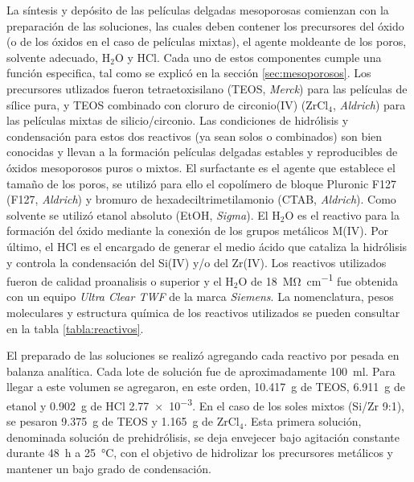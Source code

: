 			La síntesis y depósito de las películas delgadas mesoporosas comienzan con la preparación de las soluciones, las cuales deben contener los precursores del óxido (o de los óxidos en el caso de películas mixtas), el agente moldeante de los poros, solvente adecuado, H$_2$O y HCl\cite{Brinker1990}. Cada uno de estos componentes cumple una función especifica, tal como se explicó en la sección \ref{sec:mesoporosos}. Los precursores utlizados fueron tetraetoxisilano (TEOS, \textit{Merck}) para las películas de sílice pura, y TEOS combinado con cloruro de circonio(IV) (ZrCl$_4$, \textit{Aldrich}) para las películas mixtas de silicio/circonio. Las condiciones de hidrólisis y condensación para estos dos reactivos (ya sean solos o combinados) son bien conocidas y llevan a la formación películas delgadas estables y reproducibles de óxidos mesoporosos puros o mixtos\cite{Soler-Illia2004,Crepaldi2002a,Angelome2008}. El surfactante es el agente que establece el tamaño de los poros, se utilizó para ello el copolímero de bloque Pluronic F127 (F127, \textit{Aldrich}) y bromuro de hexadeciltrimetilamonio (CTAB, \textit{Aldrich}). Como solvente se utilizó etanol absoluto (EtOH, \textit{Sigma}). El H$_2$O es el reactivo para la formación del óxido mediante la conexión de los grupos metálicos M(IV). Por último, el HCl es el encargado de generar el medio ácido que cataliza la hidrólisis y controla la condensación del Si(IV) y/o del Zr(IV). Los reactivos utilizados fueron de calidad proanalisis o superior y el H$_2$O de \SI{18}{\mega\ohm\per\cm} fue obtenida con un equipo \textit{Ultra Clear TWF} de la marca \textit{Siemens}. La nomenclatura, pesos moleculares y estructura química de los reactivos utilizados se pueden consultar en la tabla \ref{tabla:reactivos}.
					
			El preparado de las soluciones se realizó agregando cada reactivo por pesada en balanza analítica. Cada lote de solución fue de aproximadamente \SI{100}{\ml}. Para llegar a este volumen se agregaron, en este orden, \SI{10.417}{\gram} de TEOS, \SI{6.911}{\gram} de etanol y \SI{0.902}{\gram} de HCl \SI{2,77e-3}{\Molar}. En el caso de los soles mixtos (Si/Zr 9:1), se pesaron \SI{9.375}{\gram} de TEOS y \SI{1.165}{\gram} de ZrCl$_4$. Esta primera solución, denominada solución de prehidrólisis, se deja envejecer bajo agitación constante durante \SI{48}{\hour} a \SI{25}{\celsius}, con el objetivo de hidrolizar los precursores metálicos y mantener un bajo grado de condensación.\cite{Grosso2001}

